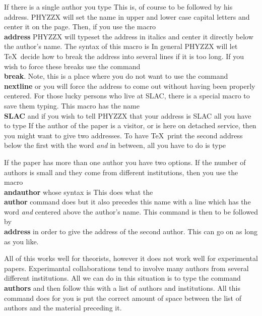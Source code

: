 If there is a single author you type
This is, of course to be followed by his address.
PHYZZX will set the name in upper and lower case capital letters
and center it on the page.
Then, if you use the macro {\bf \\address} PHYZZX will typeset the
address in italics and center it
directly below the author's name.
The syntax of this macro is
In general PHYZZX will let \TeX\ decide how to break the address
into several lines if it is too long.
If you wish to force these breaks use the command {\bf \\break}.
Note, this is a place where you do not want to use the command
{\bf \\nextline} or you will force the address to come out
without having been properly centered.
For those lucky persons who live at SLAC, there is a special macro
to save them typing.
This macro has the name {\bf \\SLAC} and if you wish to tell PHYZZX
that your address is SLAC all you have to type
\tc{\\SLAC}
If the author of the paper is a visitor, or is here on detached service,
then you might want to give two addresses.
To have \TeX\ print the second address below the first with the
word {\it and} in between, all you have to do is type
 
If the paper has more than one author you have two options.
If the number of authors is small and they come from different
institutions, then you use the macro {\bf \\andauthor}
whose syntax is
This does what the {\bf \\author} command does but it also
precedes this name with a line which has the word {\it and}
centered above the author's name.
This command is then to be followed by {\bf \\address} in order to
give the address of the second author.
This can go on as long as you like.
 
All of this works well for theorists, however it does not work
well for experimental papers.
Experimantal collaborations tend to involve many authors from
several different institutions.
All we can do in this situation is to type the command
{\bf \\authors} and then follow this with a list of authors
and institutions.
All this command does for you is put the correct amount of
space between the list of authors and the material preceding it.
 
